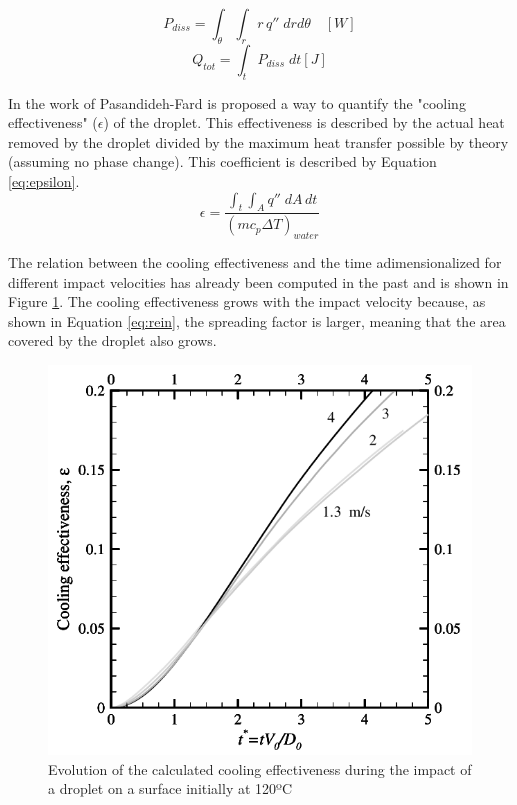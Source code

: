 \begin{equation} \label{eq:cyl}
P_{diss} = \int_\theta \int_r r \, q'' \; dr d\theta \quad [W]
\end{equation}
\begin{equation} \label{eq:qtot}
Q_{tot} = \int_t P_{diss} \; dt [J]
\end{equation}

\par In the work of Pasandideh-Fard \cite{pasandideh2001cooling} is proposed a way to quantify the "cooling effectiveness" ($\epsilon$) of the droplet. This effectiveness is described by the actual heat removed by the droplet divided by the maximum heat transfer possible by theory (assuming no phase change). This coefficient is described by Equation \ref{eq:epsilon}.\\

\begin{equation}\label{eq:epsilon}
\epsilon= \frac{\int_t \int_A q'' \; dA \, dt}{(m c_p \Delta T)_{water}}
\end{equation}

\par The relation between the cooling effectiveness and the time adimensionalized for different impact velocities has already been computed in the past \cite{pasandideh2001cooling} and is shown in Figure \ref{fig:cooling}. The cooling effectiveness grows with the impact velocity because, as shown in Equation \ref{eq:rein}, the spreading factor is larger, meaning that the area covered by the droplet also grows.

\begin{figure}[h]
\centering
\includegraphics[width=0.5\linewidth]{Figures/2.Chapter/cooling.png}
\caption {Evolution of the calculated cooling effectiveness during the impact of a droplet on a surface initially at 120ºC}
\label{fig:cooling}
\end{figure}

